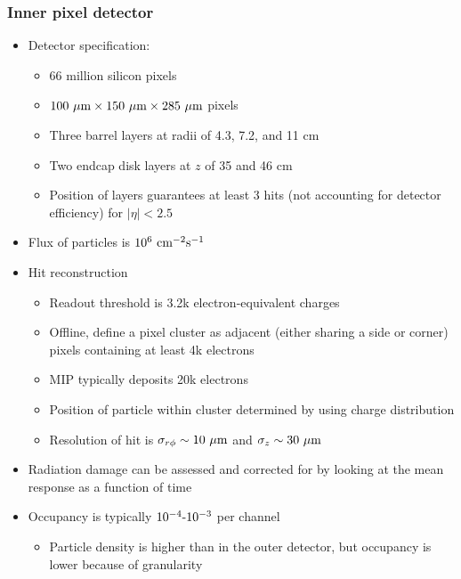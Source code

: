 \subsubsection{Inner pixel detector}
  \begin{itemize}
    \item Detector specification:
    \begin{itemize}
      \item 66 million silicon pixels
      \item $100~\mu\text{m} \times 150~\mu\text{m} \times 285~\mu\text{m}$ pixels
      \item Three barrel layers at radii of 4.3, 7.2, and 11 cm
      \item Two endcap disk layers at $z$ of 35 and 46 cm
      \item Position of layers guarantees at least 3 hits (not accounting for detector efficiency) for $|\eta|<2.5$
    \end{itemize}
    \item Flux of particles is $10^6~\text{cm}^{-2}\text{s}^{-1}$
    \item Hit reconstruction
    \begin{itemize}
      \item Readout threshold is 3.2k electron-equivalent charges
      \item Offline, define a pixel cluster as adjacent (either sharing a side or corner) pixels containing at least 4k electrons
      \item MIP typically deposits 20k electrons
      \item Position of particle within cluster determined by using charge distribution
      \item Resolution of hit is $\sigma_{r\phi} \sim 10~\mu\text{m}$ and $\sigma_z \sim 30~\mu\text{m}$
    \end{itemize}
    \item Radiation damage can be assessed and corrected for by looking at the mean response as a function of time
    \item Occupancy is typically $10^{-4}\textto10^{-3}$ per channel
    \begin{itemize}
      \item Particle density is higher than in the outer detector, but occupancy  is lower because of granularity
    \end{itemize}
  \end{itemize}
